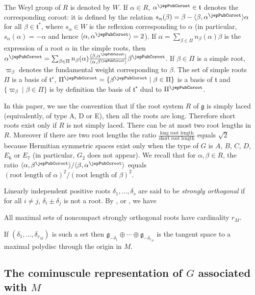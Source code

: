 The Weyl group of $R$ is denoted by $W$. If $\alpha\in R$, $\alpha^\jepPubCoroot\in\mathfrak t$ denotes the corresponding coroot: it is defined by the relation $s_\alpha(\beta)=\beta-\langle\beta,\alpha^\jepPubCoroot\rangle\alpha$ for all $\beta\in\mathfrak t^*$, where $s_\alpha\in W$ is the reflexion corresponding to $\alpha$ (in particular, $s_\alpha(\alpha)=-\alpha$ and hence $\langle\alpha,\alpha^\jepPubCoroot\rangle=2$). If $\alpha=\sum_{\beta\in\Pi}n_\beta(\alpha)\beta$ is the expression of a root $\alpha$ in the simple roots, then $\alpha^\jepPubCoroot=\sum_{\beta\in\Pi}n_\beta(\alpha)\frac{\langle\beta,\alpha^\jepPubCoroot\rangle}{\langle\alpha,\beta^\jepPubCoroot\rangle}\beta^\jepPubCoroot$. If $\beta\in\Pi$ is a simple root, $\varpi_\beta$ denotes the fundamental weight corresponding to $\beta$. The set of simple roots $\Pi$ is a basis of $\mathfrak t^{\star}$, $\Pi^\jepPubCoroot=\{\beta^\jepPubCoroot\mid\beta\in\Pi\}$ is a basis of $\mathfrak t$ and $\{\varpi_\beta\mid\beta\in\Pi\}$ is by definition the basis of $\mathfrak t^{\star}$ dual to $\Pi^\jepPubCoroot$.

In this paper, we use the convention that if the root system $R$ of $\mathfrak g$ is simply laced (equivalently, of type A, D or E), then all the roots are long. Therefore short roots exist only if $R$ is not simply laced. There can be at most two root lengths in $R$. Moreover if there are two root lengths the ratio $\frac{\text{long root length}}{\text{short root length}}$ equals $\sqrt2$ because Hermitian symmetric spaces exist only when the type of $G$ is $A$, $B$, $C$, $D$, $E_6$ or $E_7$ (in particular, $G_2$ does not appear). We recall that for $\alpha,\beta\in R$, the ratio $\langle\alpha,\beta^\jepPubCoroot\rangle/\langle\beta,\alpha^\jepPubCoroot\rangle$ equals $(\text{root length of }\alpha)^2/(\text{root length of }\beta)^2$.

Linearly independent positive roots $\delta_1,\ldots,\delta_s$ are said to be \emph{strongly orthogonal} if for all $i\neq j$, $\delta_i\pm\delta_j$ is not a root. By \cite{jep93HC56}, or \cite[Ch.~VIII, \S7]{jep93Hel01}, we have
\begin{fact}
All maximal sets of noncompact strongly orthogonal roots have cardinality $r_M$.
\end{fact}
If $(\delta_1,\ldots,\delta_{r_M})$ is such a set then $\mathfrak g_{-\delta_1}\oplus\cdots\oplus\mathfrak g_{-\delta_{r_M}}$ is the tangent space to a maximal polydisc through the origin in $M$.

\subsection{The cominuscule representation of $G$ associated with $M$}
